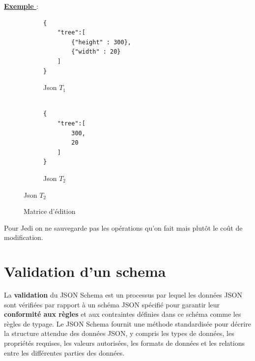             \textbf{\underline{Exemple }}: 
            \begin{figure}[H]
                \centering
                \begin{subfigure}[H]{0.45\linewidth}
                    \begin{verbatim}
{
    "tree":[
        {"height" : 300},
        {"width" : 20}
    ]
}
                    \end{verbatim}
                    \caption{Json $T_1$}
                \end{subfigure}
                \hfill
                \begin{subfigure}[H]{0.45\linewidth}
                    \centering
                    \begin{verbatim}
                        
{
    "tree":[
        300,
        20
    ]
}
                    \end{verbatim}
                    \caption{Json $T_2$}
                \end{subfigure} 
                
            \end{figure}
            \begin{figure}[H]\ContinuedFloat
                \centering
                
                \caption{Matrice d'édition}
            \end{figure}

            \begin{remark}
                Pour Jedi on ne sauvegarde pas les opérations qu'on fait mais plutôt le coût de modification.
            \end{remark}
            

    \section{Validation d'un schema}


        La \textbf{validation} du JSON Schema est un processus par lequel les données JSON sont vérifiées par rapport à un schéma JSON spécifié pour garantir leur \textbf{conformité aux règles} et aux contraintes définies dans ce schéma comme les règles de typage\cite{Validation}. Le JSON Schema fournit une méthode standardisée pour décrire la structure attendue des données JSON, y compris les types de données, les propriétés requises, les valeurs autorisées, les formats de données et les relations entre les différentes parties des données. \cite{FoundationOfJSONSchema}

